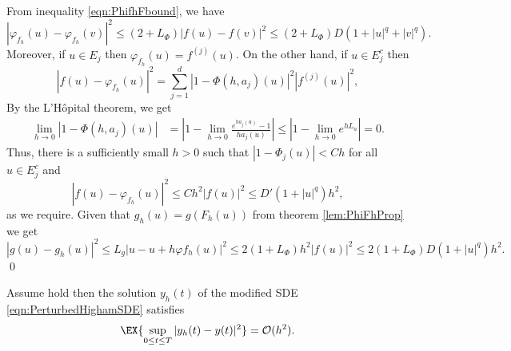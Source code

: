 \begin{pf}
	From inequality \eqref{eqn:PhifhFbound}, we have
	\begin{equation*}
		|\varphi_{f_h}(u) - \varphi_{f_h}(v)|^2
		\leq
			(2 + L_{\Phi}) |f(u) - f(v)|^2 
			\leq
				(2 + L_{\Phi}) D (1 + |u|^q +|v|^q). 
	\end{equation*}
	Moreover, if $u \in E_j$ then $\varphi_{f_h}(u) = f^{(j)}(u)$. On the other hand,  if $u\in E_j^c$ then
	$$
		|f(u) - \varphi_{f_h}(u)|^2
		=
		\sum_{j=1}^d
			|1-\Phi(h,a_j)(u)|^2 |f^{(j)}(u)|^2,	
	$$
	 By the L'H\^{o}pital 
	theorem, we get
	\begin{align*}
		\lim_{h \to 0} |1-\Phi(h,a_j)(u)| 
			&= \left|
				1-\lim_{h\to 0} \frac{e^{h a_j(u)}-1}{h a_j(u)}
			\right|			
			\leq 
				\left|
					1-\lim_{h\to 0} e^{h L_a}
				\right|=0.			
	\end{align*}
	Thus, there is a sufficiently small $h>0$  such that
	$|1-\Phi_j(u)|<C h$ for all $u\in E_j^c$ and
	$$
		|f(u) - \varphi_{f_h}(u)|^2
		\leq
		Ch^2 |f(u)|^2
		\leq D'(1+|u|^q)h^2,	
	$$
	as we require. Given that $g_h(u)=g(F_h(u))$ from 
	theorem \ref{lem:PhiFhProp} we get
	\begin{equation*}
		|g(u) - g_h(u)|^2 
		\leq
			L_g |u - u +h \varphi{f_h}(u)|^2 
		\leq 
			2(1+L_{\Phi})h^2 |f(u)|^2
		\leq
			2(1+L_{\Phi}) D(1+|u|^q) h^2. 
	\end{equation*}
	\qed
\end{pf}
%
\begin{lem}\label{lem:yhyOh}
	Assume  hold then the solution $y_h(t)$ of 
	the modified SDE \eqref{eqn:PerturbedHighamSDE}
	satisfies
	\begin{equation}
		\EX{
			\sup_{0\leq t \leq T}
			|y_h(t) - y(t)|^2	
		} = \mathcal{O}(h^2).
	\end{equation}	
\end{lem}
